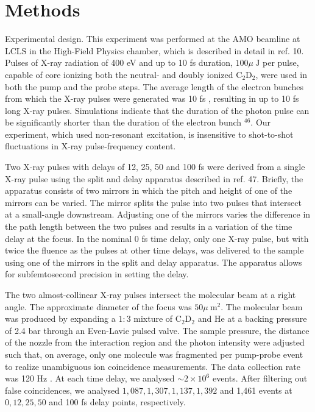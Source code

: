 \documentclass[10pt]{article}
\begin{document}
\section*{Methods}
Experimental design. This experiment was performed at the AMO beamline at LCLS in the High-Field Physics chamber, which is described in detail in ref. 10. Pulses of X-ray radiation of 400 eV and up to 10 fs duration, $100 \mu \mathrm{~J}$ per pulse, capable of core ionizing both the neutral- and doubly ionized $\mathrm{C}_{2} \mathrm{D}_{2}$, were used in both the pump and the probe steps. The average length of the electron bunches from which the X-ray pulses were generated was 10 fs , resulting in up to 10 fs long X-ray pulses. Simulations indicate that the duration of the photon pulse can be significantly shorter than the duration of the electron bunch ${ }^{46}$. Our experiment, which used non-resonant excitation, is insensitive to shot-to-shot fluctuations in X-ray pulse-frequency content.

Two X-ray pulses with delays of 12, 25, 50 and 100 fs were derived from a single X-ray pulse using the split and delay apparatus described in ref. 47. Briefly, the apparatus consists of two mirrors in which the pitch and height of one of the mirrors can be varied. The mirror splits the pulse into two pulses that intersect at a small-angle downstream. Adjusting one of the mirrors varies the difference in the path length between the two pulses and results in a variation of the time delay at the focus. In the nominal 0 fs time delay, only one X-ray pulse, but with twice the fluence as the pulses at other time delays, was delivered to the sample using one of the mirrors in the split and delay apparatus. The apparatus allows for subfemtosecond precision in setting the delay.

The two almost-collinear X-ray pulses intersect the molecular beam at a right angle. The approximate diameter of the focus was $50 \mu \mathrm{~m}^{2}$. The molecular beam was produced by expanding a $1: 3$ mixture of $\mathrm{C}_{2} \mathrm{D}_{2}$ and He at a backing pressure of 2.4 bar through an Even-Lavie pulsed valve. The sample pressure, the distance of the nozzle from the interaction region and the photon intensity were adjusted such that, on average, only one molecule was fragmented per pump-probe event to realize unambiguous ion coincidence measurements. The data collection rate was 120 Hz . At each time delay, we analysed $\sim 2 \times 10^{6}$ events. After filtering out false coincidences, we analysed $1,087,1,307,1,137,1,392$ and 1,461 events at $0,12,25,50$ and 100 fs delay points, respectively.
\end{document}
